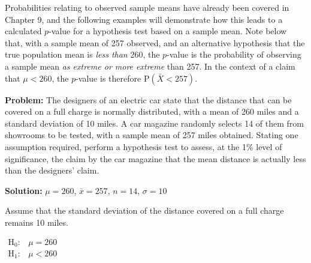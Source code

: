 \documentclass[
  11pt,
]{book}
\begin{document}
Probabilities relating to observed sample means have already been covered in Chapter 9, and the following examples will demonstrate how this leads to a calculated \(p\)-value for a hypothesis test based on a sample mean. Note below that, with a sample mean of 257 observed, and an alternative hypothesis that the true population mean is \emph{less than} 260, the \(p\)-value is the probability of observing a sample mean \emph{as extreme or more extreme} than 257. In the context of a claim that \(\mu<\text{260}\), the \(p\)-value is therefore \(\text{P}\left(\bar{X}<\text{257}\right)\).

\begin{tcolorbox}[title=Example,colback=RoyalBlue!1!,colframe=RoyalBlue]
\textbf{Problem:} The designers of an electric car state that the distance that can be covered on a full charge is normally distributed, with a mean of 260 miles and a standard deviation of 10 miles. A car magazine randomly selects 14 of them from showrooms to be tested, with a sample mean of 257 miles obtained. Stating one assumption required, perform a hypothesis test to assess, at the 1\% level of significance, the claim by the car magazine that the mean distance is actually less than the designers' claim.

\tcblower
\textbf{Solution:}
$\mu=\text{260}$, $\bar{x}=\text{257}$, $n=\text{14}$, $\sigma=\text{10}$\\

\vspace{0.02cm}

Assume that the standard deviation of the distance covered on a full charge remains 10 miles.\\

\vspace{0.1cm}

\begin{math}
\begin{array}{ll}
      \text{H}_\text{0}: & \mu=\text{260}\\
      \text{H}_\text{1}: & \mu<\text{260}
    \end{array}
\end{math}

\vspace{0.5cm}


\end{tcolorbox}
\end{document}
